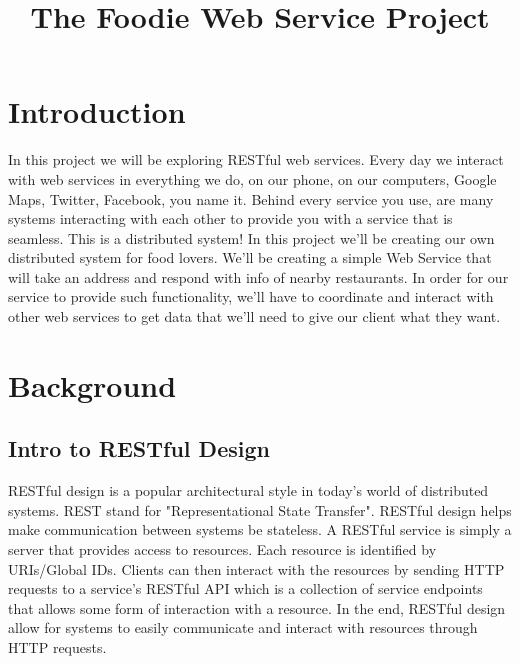 \documentclass{article}
\title{The Foodie Web Service Project\\ } %
\date{} %
\begin{document}
\maketitle %


\section*{Introduction} %

In this project we will be exploring RESTful web services. Every day we interact with web services in everything we do, on our phone, on our computers, Google Maps, Twitter, Facebook, you name it. Behind every service you use, are many systems interacting with each other to provide you with a service that is seamless. This is a distributed system! In this project we'll be creating our own distributed system for food lovers. We'll be creating a simple Web Service that will take an address and respond with info of nearby restaurants. In order for our service to provide such functionality, we'll have to coordinate and interact with other web services to get data that we'll need to give our client what they want.


\section*{Background}

\subsection*{Intro to RESTful Design}
RESTful design is a popular architectural style in today's world of distributed systems. REST stand for "Representational State Transfer".  RESTful design helps make communication between systems be stateless. A RESTful service is simply a server that provides access to resources. Each resource is identified by URIs/Global IDs. Clients can then interact with the resources by sending HTTP requests to a service's RESTful API which is a collection of service endpoints that allows some form of interaction with a resource. In the end, RESTful design allow for systems to easily communicate and interact with resources through HTTP requests.
\end{document}
